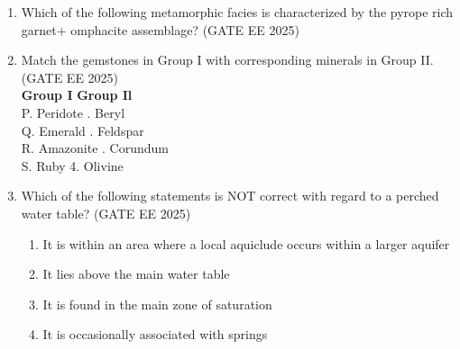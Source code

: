 \documentclass[journal]{IEEEtran}
\begin{document}
\begin{enumerate}[start=1]
\item Which of the following metamorphic facies is characterized by the pyrope rich garnet$+$ omphacite assemblage?
\hfill{(GATE EE 2025)}\\
\begin{enumerate}
\end{enumerate}
\item Match the gemstones in Group I with corresponding minerals in Group II.\\
\hfill{(GATE EE 2025)}\\
\vspace{0cm}
\textbf{Group I} \hspace{3cm}
\textbf{Group Il}\\
P. Peridote \qquad \qquad \qquad {}. Beryl\\
Q. Emerald \qquad \qquad \qquad {}. Feldspar\\
R. Amazonite \qquad \qquad \quad {}. Corundum\\
S. Ruby \qquad \qquad \qquad \qquad \hspace{0.4cm} 4. Olivine\\
\begin{enumerate}
\end{enumerate}

\item Which of the following statements is NOT correct with regard to a perched water table?
\hfill{(GATE EE 2025)}\\
\begin{enumerate}

    \item It is within an area where a local aquiclude occurs within a larger aquifer
    \item It lies above the main water table
    \item It is found in the main zone of saturation
    \item It is occasionally associated with springs


\end{enumerate}
\end{enumerate}
\end{document}
